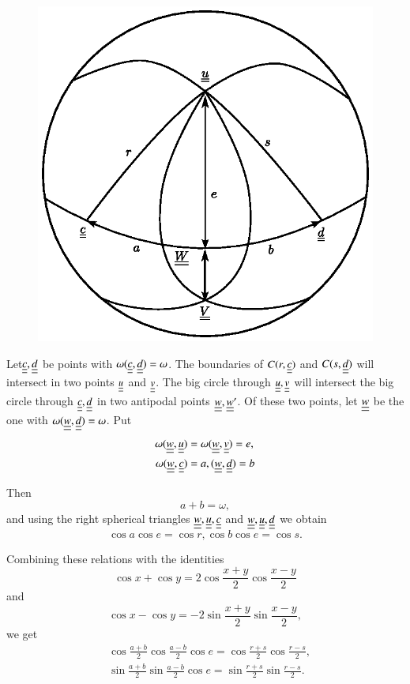 \begin{figure}[H]
\centering
\includegraphics{fig3.eps}
\end{figure}

Let\pageoriginale $\underline{\underline{c}}, \underline{\underline{d}}$ be points with $\omega (\underline{\underline{c}}, \underline{\underline{d}}) = \omega$. The boundaries of $C(r, \underline{\underline{c}})$ and $C(s, \underline{\underline{d}})$ will intersect in two points $\underline{\underline{u}}$ and $\underline{\underline{v}}$. The big circle through $\underline{\underline{u}}, \underline{\underline{v}}$ will intersect the big circle through $\underline{\underline{c}}, \underline{\underline{d}}$ in two antipodal points $\underline{\underline{w}}, \underline{\underline{w}}'$. Of these two points, let $\underline{\underline{w}}$ be the one with $\omega (\underline{\underline{w}}, \underline{\underline{d}}) = \omega$. Put
\begin{align*}
\omega (\underline{\underline{w}}, \underline{\underline{u}}) & = \omega (\underline{\underline{w}}, \underline{\underline{v}}) = e,\\
\omega (\underline{\underline{w}}, \underline{\underline{c}}) & = a, (\underline{\underline{w}}, \underline{\underline{d}}) = b
\end{align*}

Then
$$
a+b = \omega,
$$
and using the right spherical triangles $\underline{\underline{w}}, \underline{\underline{u}}, \underline{\underline{c}}$ and $\underline{\underline{w}}, \underline{\underline{u}}, \underline{\underline{d}}$ we obtain
$$
\cos a \cos e = \cos r, \cos b \cos e = \cos s.
$$


Combining these relations with the identities
$$
\cos x + \cos y = 2 \cos \frac{x+y}{2} \cos \frac{x-y}{2}
$$
and
$$
\cos x - \cos y = -2 \sin \frac{x+y}{2} \sin \frac{x-y}{2},
$$
we get
\begin{align*}
& \cos \frac{a+b}{2} \cos \frac{a-b}{2} \cos e = \cos \frac{r+s}{2} \cos \frac{r-s}{2},\\
& \sin \frac{a+b}{2} \sin \frac{a-b}{2} \cos e = \sin \frac{r+s}{2} \sin \frac{r-s}{2}.\\
\end{align*}

